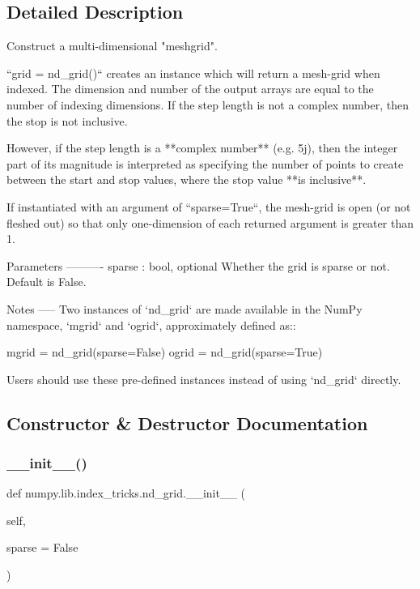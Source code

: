 \subsection{Detailed Description}
\begin{DoxyVerb}Construct a multi-dimensional "meshgrid".

``grid = nd_grid()`` creates an instance which will return a mesh-grid
when indexed.  The dimension and number of the output arrays are equal
to the number of indexing dimensions.  If the step length is not a
complex number, then the stop is not inclusive.

However, if the step length is a **complex number** (e.g. 5j), then the
integer part of its magnitude is interpreted as specifying the
number of points to create between the start and stop values, where
the stop value **is inclusive**.

If instantiated with an argument of ``sparse=True``, the mesh-grid is
open (or not fleshed out) so that only one-dimension of each returned
argument is greater than 1.

Parameters
----------
sparse : bool, optional
    Whether the grid is sparse or not. Default is False.

Notes
-----
Two instances of `nd_grid` are made available in the NumPy namespace,
`mgrid` and `ogrid`, approximately defined as::

    mgrid = nd_grid(sparse=False)
    ogrid = nd_grid(sparse=True)

Users should use these pre-defined instances instead of using `nd_grid`
directly.
\end{DoxyVerb}
 

\subsection{Constructor \& Destructor Documentation}
\mbox{\label{classnumpy_1_1lib_1_1index__tricks_1_1nd__grid_a8d1b5d244d2aacfd699fec7f23d5fa94}} 
\subsubsection{\texorpdfstring{\+\_\+\+\_\+init\+\_\+\+\_\+()}{\_\_init\_\_()}}
{\footnotesize\ttfamily def numpy.\+lib.\+index\+\_\+tricks.\+nd\+\_\+grid.\+\_\+\+\_\+init\+\_\+\+\_\+ (\begin{DoxyParamCaption}\item[{}]{self,  }\item[{}]{sparse = {\ttfamily False} }\end{DoxyParamCaption})}



